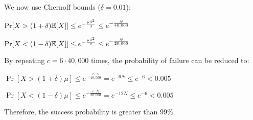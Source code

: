 We now use Chernoff bounds ($\delta = 0.01$):

$\Pr[X > (1 + \delta) \mathbb{E}[X]] \leq e^{-\frac{\mu\delta^2}{4}} \leq e^{-\frac{N}{40,000}}$

$\Pr[X < (1 - \delta) \mathbb{E}[X]] \leq e^{-\frac{\mu\delta^2}{2}} \leq e^{-\frac{N}{20,000}}$

By repeating $c = 6 \cdot 40,000$ times, the probability of failure can be reduced to:

$\Pr[X > (1 + \delta)\mu] \leq e^{-\frac{c\cdot N}{40,000}} = e^{-6N} \leq e^{-6} <  0.005$

$\Pr[X < (1 - \delta)\mu] \leq e^{-\frac{c\cdot N}{20,000}} = e^{-12N} \leq e^{-6} <  0.005$


Therefore, the success probability is greater than $99\%$.
